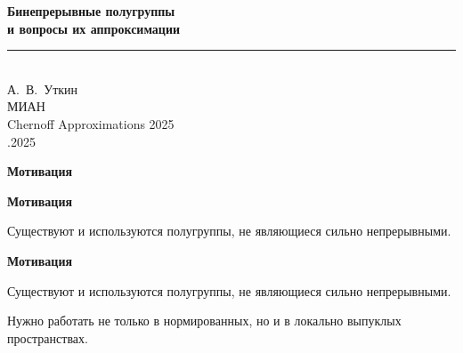 \documentclass[11pt]{article}
\begin{document}
\vspace*{\fill}
\begin{center}
{\color{notaeYELLOW}\bfseries\fontsize{56}{64}\selectfont Бинепрерывные полугруппы\\ и вопросы их аппроксимации}\\[0.5em]
{\color{notaeGOLD}\rule{6.4in}{1.5pt}}\\[1.3em]
{\color{notaeTEXT}\fontsize{34}{40}\selectfont А.~В.~Уткин}\\[0.5em]
{\color{notaeMUTED}\fontsize{24}{29}\selectfont МИАН}\\[1.1em]
{\color{notaeBLUE}\fontsize{26}{31}\selectfont Chernoff Approximations 2025}\\[0.4em]
{\color{notaeMUTED}\fontsize{22}{27}.2025}
\end{center}
\vspace*{\fill}

\newpage

\begin{center}
{\color{notaeYELLOW}\bfseries\fontsize{44}{52}\selectfont Мотивация}
\end{center}
\vspace*{\fill}
\begin{center}
\fontsize{36}{43}\selectfont
\end{center}
\vspace*{\fill}

\newpage

\begin{center}
{\color{notaeYELLOW}\bfseries\fontsize{44}{52}\selectfont Мотивация}
\end{center}
\vspace*{\fill}
\begin{center}
\fontsize{36}{43}\selectfont
\parbox{\linewidth}{\centering\noindent Существуют и используются полугруппы, не являющиеся сильно непрерывными.
\par}\vspace{0.4in}
\end{center}
\vspace*{\fill}

\newpage

\begin{center}
{\color{notaeYELLOW}\bfseries\fontsize{44}{52}\selectfont Мотивация}
\end{center}
\vspace*{\fill}
\begin{center}
\fontsize{36}{43}\selectfont
\parbox{\linewidth}{\centering\noindent Существуют и используются полугруппы, не являющиеся сильно непрерывными.
\par}\vspace{0.4in}
\parbox{\linewidth}{\centering\noindent Нужно работать не только в нормированных, но и в локально выпуклых пространствах.
\par}\vspace{0.4in}
\end{center}
\vspace*{\fill}
\end{document}

